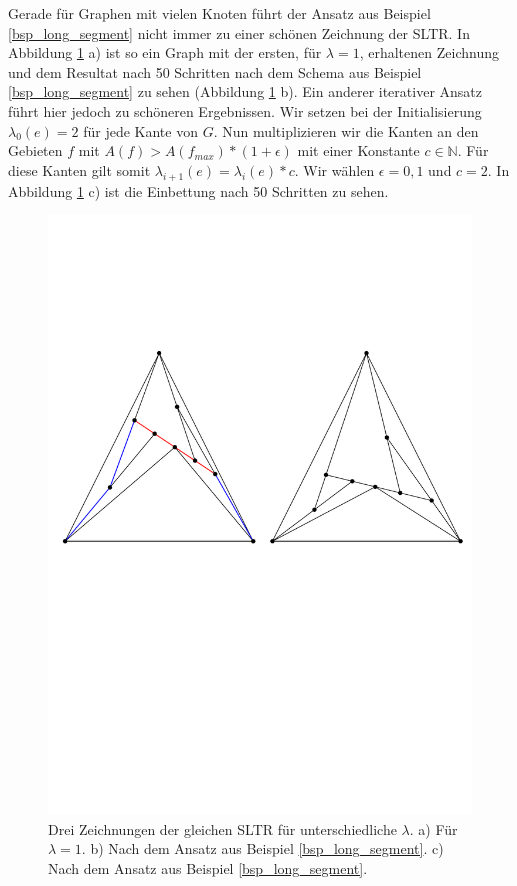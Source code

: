 \begin{example}\label{bsp_large_corner} 
Gerade für Graphen mit vielen Knoten führt der Ansatz aus Beispiel \ref{bsp_long_segment} nicht immer zu einer schönen Zeichnung der SLTR. In Abbildung \ref{large_corner} a) ist so ein Graph mit der ersten, für $\lambda=1$, erhaltenen Zeichnung und dem Resultat nach 50 Schritten nach dem Schema aus Beispiel \ref{bsp_long_segment} zu sehen (Abbildung \ref{large_corner} b). Ein anderer iterativer Ansatz führt hier jedoch zu schöneren Ergebnissen. Wir setzen bei der Initialisierung $\lambda_0(e)=2$ für jede Kante von $G$. Nun multiplizieren wir die Kanten an den Gebieten $f$ mit $A(f) > A(f_{max})*(1+\epsilon)$ mit einer Konstante $c \in \mathbb{N}$. Für diese Kanten gilt somit $\lambda_{i+1}(e) = \lambda_{i}(e)*c$. Wir wählen $\epsilon = 0,1$ und $c=2$. In Abbildung \ref{large_corner} c) ist die Einbettung nach 50 Schritten zu sehen.
\end{example}

\begin{figure}[h]
	\centering
  \includegraphics[width=1\textwidth]{example1_vis.pdf}
  \caption{Drei Zeichnungen der gleichen SLTR für unterschiedliche $\lambda$. a) Für $\lambda=1$. b) Nach dem Ansatz aus Beispiel \ref{bsp_long_segment}. c) Nach dem Ansatz aus Beispiel \ref{bsp_long_segment}.}
  \label{large_corner}
\end{figure}

